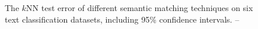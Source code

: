 \begin{figure}
\vspace*{-1cm}
\caption{The $k$NN test error of different semantic matching techniques
         on six text classification datasets, including 95\% confidence
         intervals. -- \textcite[Figure 8]{novotny2020text}}
\end{figure}